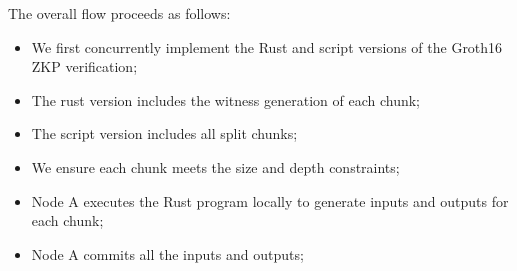 The overall flow proceeds as follows:
\begin{itemize}
    \item We first concurrently implement the Rust and script versions of the Groth16 ZKP verification;
    \item The rust version includes the witness generation of each chunk;
    \item The script version includes all split chunks;
    \item We ensure each chunk meets the size and depth constraints;
    \item Node A executes the Rust program locally to generate inputs and outputs for each chunk;
    \item Node A commits all the inputs and outputs;
\end{itemize}
